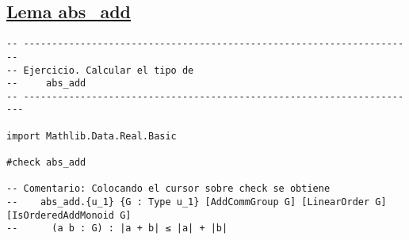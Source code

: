 \subsection{\href{./src/Basicos/abs\_add.lean}{Lema abs\_add}}
\label{sec:org7a89a97}
\begin{verbatim}
-- ---------------------------------------------------------------------
-- Ejercicio. Calcular el tipo de
--     abs_add
-- ----------------------------------------------------------------------

import Mathlib.Data.Real.Basic

#check abs_add

-- Comentario: Colocando el cursor sobre check se obtiene
--    abs_add.{u_1} {G : Type u_1} [AddCommGroup G] [LinearOrder G] [IsOrderedAddMonoid G]
--      (a b : G) : |a + b| ≤ |a| + |b|
\end{verbatim}


